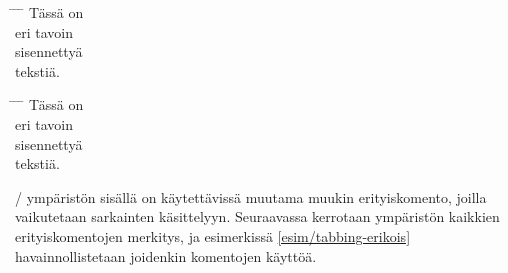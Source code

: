 \begin{esimerkki*}
  \komentoi{=}
  \komentoi{>}

\begin{koodilohko}
\begin{tabbing}
  \hspace{23mm} \= \hspace{23mm} \= \hspace{23mm} \= \kill
  Tässä \> on \\
  \> eri \> tavoin \\
  \>\> sisennettyä \\
  \>\>\> tekstiä.
\end{tabbing}
\end{koodilohko}

  \begin{tulos}
    \begin{tabbing}
      \hspace{23mm} \= \hspace{23mm} \= \hspace{23mm} \= \kill
      Tässä \> on \\
      \> eri \> tavoin \\
      \>\> sisennettyä \\
      \>\>\> tekstiä.
    \end{tabbing}
  \end{tulos}
  \caption{Sarkainkohtien määrittely ja käyttö \-/
    ympäristössä}
  \label{esim/tabbing-perus}
\end{esimerkki*}

\-/ ympäristön sisällä on käytettävissä muutama
muukin erityiskomento, joilla vaikutetaan sarkainten käsittelyyn.
Seuraavassa kerrotaan ympäristön kaikkien erityiskomentojen merkitys, ja
esimerkissä \ref{esim/tabbing-erikois} havainnollistetaan joidenkin
komentojen käyttöä.

